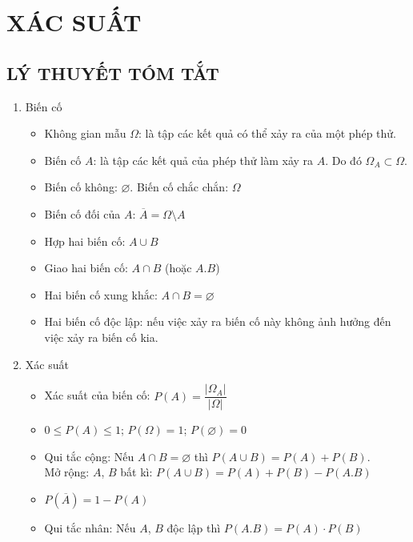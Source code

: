 \section{XÁC SUẤT}
\subsection{LÝ THUYẾT TÓM TẮT}
\begin{enumerate}
\item Biến cố
\begin{itemize}
 \item Không gian mẫu $\Omega$: là tập các kết quả có thể xảy ra của một phép thử.
 \item Biến cố $A$: là tập các kết quả của phép thử làm xảy ra $A$. Do đó $\Omega_A \subset \Omega$.
 \item Biến cố không: $\varnothing$. Biến cố chắc chắn: $\Omega$
 \item Biến cố đối của $A$: $\overline{A}=\Omega \setminus A$
 \item Hợp hai biến cố: $A \cup B$ 
 \item Giao hai biến cố: $A \cap B$ (hoặc $A.B$)
 \item Hai biến cố xung khắc: $A \cap B = \varnothing$
 \item Hai biến cố độc lập: nếu việc xảy ra biến cố này không ảnh hưởng đến việc xảy ra biến cố kia.
\end{itemize}
\item Xác suất
\begin{itemize}
\item Xác suất của biến cố: $P(A) = \dfrac{|\Omega_A|}{|\Omega|}$
\item $0 \le P(A) \le 1$; $P(\Omega) = 1$; $P(\varnothing) = 0$
\item Qui tắc cộng: Nếu $A \cap B = \varnothing$ thì $P(A \cup B) = P(A) + P(B)$.\\
 Mở rộng: $A$, $B$ bất kì: $P(A \cup B) = P(A) + P(B) - P(A. B)$
 \item $P(\overline{A}) = 1 - P(A)$
\item Qui tắc nhân: Nếu $A$, $B$ độc lập thì $P(A. B) = P(A) \cdot P(B)$
\end{itemize}
\end{enumerate}
